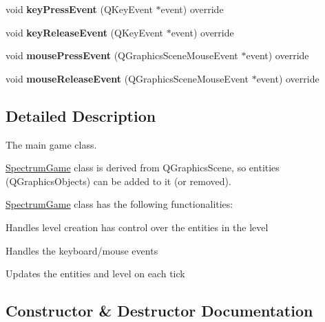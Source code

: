 \begin{DoxyCompactItemize}
\mbox{\label{class_spectrum_game_af84cd40c3c89f89115ae0879e43aed00}} 
void {\bfseries key\+Press\+Event} (Q\+Key\+Event $\ast$event) override
\item 
\mbox{\label{class_spectrum_game_ac239ec6f01c0de472b4145b7d7e0c82e}} 
void {\bfseries key\+Release\+Event} (Q\+Key\+Event $\ast$event) override
\item 
\mbox{\label{class_spectrum_game_a7e9836562910f72d5884429afe8e6655}} 
void {\bfseries mouse\+Press\+Event} (Q\+Graphics\+Scene\+Mouse\+Event $\ast$event) override
\item 
\mbox{\label{class_spectrum_game_aa13f5986e9297c57d523818c28ddf68a}} 
void {\bfseries mouse\+Release\+Event} (Q\+Graphics\+Scene\+Mouse\+Event $\ast$event) override
\end{DoxyCompactItemize}


\subsection{Detailed Description}
The main game class. 

\hyperlink{class_spectrum_game}{Spectrum\+Game} class is derived from Q\+Graphics\+Scene, so entities (Q\+Graphics\+Objects) can be added to it (or removed).

\hyperlink{class_spectrum_game}{Spectrum\+Game} class has the following functionalities\+:
\begin{DoxyItemize}
\item Handles level creation has control over the entities in the level
\item Handles the keyboard/mouse events
\item Updates the entities and level on each tick 
\end{DoxyItemize}

\subsection{Constructor \& Destructor Documentation}
\mbox{\label{class_spectrum_game_ac410e5206f57c99ee344d63946c66879}} 
